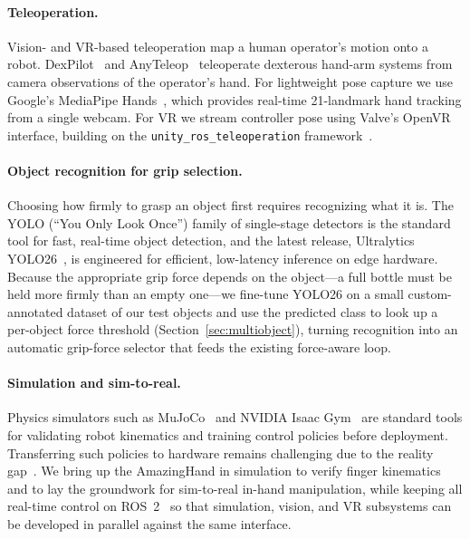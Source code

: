 \documentclass[acmlarge,screen,nonacm]{acmart}
\begin{document}
\paragraph{Teleoperation.}
Vision- and VR-based teleoperation map a human operator's motion onto a robot.
DexPilot~\cite{handa2020dexpilot} and AnyTeleop~\cite{qin2023anyteleop}
teleoperate dexterous hand-arm systems from camera observations of the
operator's hand. For lightweight pose capture we use Google's MediaPipe
Hands~\cite{zhang2020mediapipe}, which provides real-time 21-landmark hand
tracking from a single webcam. For VR we stream controller pose using Valve's
OpenVR~\cite{valve2024openvr} interface, building on the
\texttt{unity\_ros\_teleoperation} framework~\cite{leggedrobotics_teleop}.

\paragraph{Object recognition for grip selection.}
Choosing how firmly to grasp an object first requires recognizing what it is.
The YOLO (``You Only Look Once'') family of single-stage detectors is the
standard tool for fast, real-time object detection, and the latest release,
Ultralytics YOLO26~\cite{ultralytics_yolo26}, is engineered for efficient,
low-latency inference on edge hardware. Because the appropriate grip force
depends on the object---a full bottle must be held more firmly than an empty
one---we fine-tune YOLO26 on a small custom-annotated dataset of our test
objects and use the predicted class to look up a per-object force threshold
(Section~\ref{sec:multiobject}), turning recognition into an automatic
grip-force selector that feeds the existing force-aware loop.

\paragraph{Simulation and sim-to-real.}
Physics simulators such as MuJoCo~\cite{todorov2012mujoco} and NVIDIA Isaac
Gym~\cite{makoviychuk2021isaacgym} are standard tools for validating robot
kinematics and training control policies before deployment. Transferring such
policies to hardware remains challenging due to the reality
gap~\cite{zhao2020sim2real}.
We bring up the AmazingHand in simulation to verify finger
kinematics and to lay the groundwork for sim-to-real in-hand manipulation,
while keeping all real-time control on ROS~2~\cite{macenski2022ros2} so that
simulation, vision, and VR subsystems can be developed in parallel against the
same interface.
\end{document}
